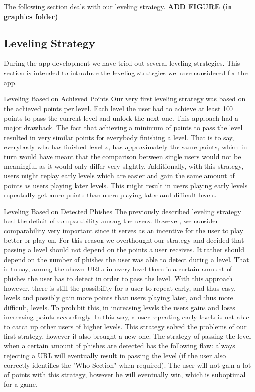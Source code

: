 The following section deals with our leveling strategy.
\textbf{ADD FIGURE (in graphics folder)}
\subsection{Leveling Strategy}
During the app development we have tried out several leveling strategies. This section is intended to introduce the leveling strategies we have considered for the app.

\begin{description}[leftmargin=0cm]
	\item{Leveling Based on Achieved Points} Our very first leveling strategy was based on the achieved points per level. Each level the user had to achieve at least 100 points to pass the current level and unlock the next one. This approach had a major drawback. The fact that achieving a minimum of points to pass the level resulted in very similar points for everybody finishing a level. That is to say, everybody who has finished level x, has approximately the same points, which in turn would have meant that the comparison between single users would not be meaningful as it would only differ very slightly. Additionally, with this strategy, users might replay early levels which are easier and gain the same amount of points as users playing later levels. This might result in users playing early levels repeatedly get more points than users playing later and difficult levels.
	\item{Leveling Based on Detected Phishes} The previously described leveling strategy had the deficit of comparability among the users. However, we consider comparability very important  since it serves as an incentive for the user to play better or play on. For this reason we overthought our strategy and decided that passing a level should not depend on the points a user receives. It rather should depend on the number of phishes the user was able to detect during a level. That is to say, among the shown URLs in every level there is a certain amount of phishes the user has to detect in order to pass the level. With this approach however, there is still the possibility for a user to repeat early, and thus easy, levels and possibly gain more points than users playing later, and thus more difficult, levels. To prohibit this, in increasing levels the users gains and loses increasing points accordingly. In this way, a user repeating early levels is not able to catch up other users of higher levels. This strategy solved the problems of our first strategy, however it also brought a new one. The strategy of passing the level when a certain amount of phishes are detected has the following flaw: always rejecting a URL will eventually result in passing the level (if the user also correctly identifies the "Who-Section" when required). The user will not gain a lot of points with this strategy, however he will eventually win, which is suboptimal for a game.  

\end{description}
